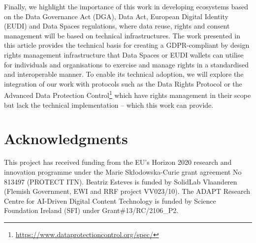 \documentclass{IOS-Book-Article}     %
\begin{document}
Finally, we highlight the importance of this work in developing ecosystems based on the Data Governance Act (DGA), Data Act, European Digital Identity (EUDI) and Data Spaces regulations, where data reuse, rights and consent management will be based on technical infrastructures.
The work presented in this article provides the technical basis for creating a GDPR-compliant by design rights management infrastructure that Data Spaces or EUDI wallets can utilise for individuals and organisations to exercise and manage rights in a standardised and interoperable manner.
To enable its technical adoption, we will explore the integration of our work with protocols such as the Data Rights Protocol or the Advanced Data Protection Control\footnote{\url{https://www.dataprotectioncontrol.org/spec/}} which have rights management in their scope but lack the technical implementation -- which this work can provide. 

\section*{Acknowledgments}
This project has received funding from the EU’s Horizon 2020 research and innovation programme under the Marie Skłodowska-Curie grant agreement No 813497 (PROTECT ITN). Beatriz Esteves is funded by SolidLab Vlaanderen (Flemish Government, EWI and RRF project VV023/10).
The ADAPT Research Centre for AI-Driven Digital Content Technology is funded by Science Foundation Ireland (SFI) under Grant\#13/RC/2106\_P2.




\end{document}
